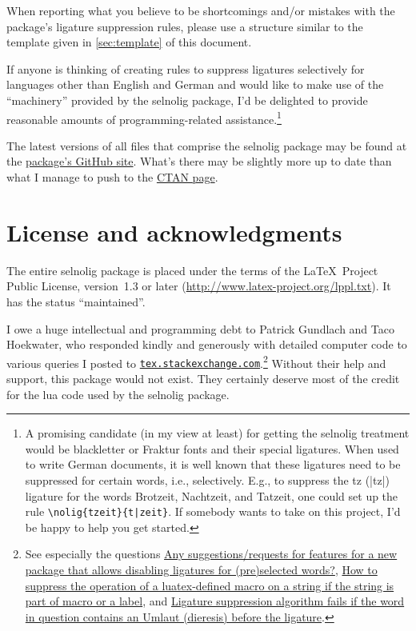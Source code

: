 \documentclass[11pt]{article}
\newcommand{\pkg}[1]{\textsf{#1}}
\begin{document}
When reporting what you believe to be shortcomings and/or mistakes with the package's ligature suppression rules, please use a structure similar to the template given in \cref{sec:template} of this document. 

If anyone is thinking of creating rules to suppress ligatures selectively for languages other than English and German and would like to make use of the \enquote{machinery} provided by the \pkg{selnolig} package, I'd be delighted to provide reasonable amounts of programming-related assistance.\footnote{A promising candidate (in my view at least) for getting the \pkg{selnolig} treatment would be {\blackletter blackletter} or {\blackletter Fraktur} fonts and their special ligatures. When used to write German documents, it is well known that these ligatures need to be suppressed for certain words, i.e., selectively. E.g., to suppress the {\blackletter tz} (|tz|) ligature for the words {\blackletter Brotzeit}, {\blackletter Nachtzeit}, and {\blackletter Tatzeit}, one could set up the rule \Verb+\nolig{tzeit}{t|zeit}+. If somebody wants to take on this project, I'd be happy to help you get started.}

The latest versions of all files that comprise the \pkg{selnolig} package may be found at the  \href{https://github.com/micoloretan/selnolig}{package's GitHub site}. What's there may be slightly more up to date than what I manage to push to the \href{http://ctan.org/tex-archive/macros/luatex/latex/selnolig}{CTAN page}.

\section{License and acknowledgments} \label{sec:thanks}

The entire \pkg{selnolig} package is placed under the terms of the \LaTeX\ Project Public License, version~1.3 or later (\url{http://www.latex-project.org/lppl.txt}).
It has the status \enquote{maintained}.

I owe a huge intellectual and programming debt to Patrick Gundlach and Taco Hoekwater, who responded kindly and generously with detailed computer code to various queries I posted to \href{http://tex.stackexchange.com}{\texttt{tex.stackexchange.com}}.\footnote{See especially the questions \href{http://tex.stackexchange.com/q/37443/5001}{Any suggestions/requests for features for a new package that allows disabling ligatures for (pre)selected words?}, \href{http://tex.stackexchange.com/q/48516/5001}{How to suppress the operation of a luatex-defined macro on a string if the string is part of macro or a label}, and \href{http://tex.stackexchange.com/q/63005/5001}{Ligature suppression algorithm fails if the word in question contains an Umlaut (dieresis) before the ligature}.} Without their help and support, this package would not exist. They certainly deserve most of the credit for the lua code used by the \pkg{selnolig} package.
\end{document}

